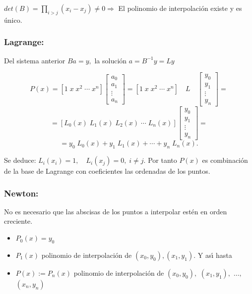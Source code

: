 \documentclass[twoside]{report}
\begin{document}
\vspace{0.3cm}

$det(B)=\prod_ {i>j}(x_i-x_j)\neq 0 \Rightarrow$ El polinomio de interpolaci\'{o}n existe y es \'{u}nico.

\subsubsection{Lagrange:}

Del sistema anterior $Ba=y,$ la soluci\'{o}n $a=B^{-1}y=Ly$

$$P(x)=[1\;x\;x^2\; \cdots\; x^n]\left[\begin{array}{c} a_0\\a_1\\
\vdots \\a_n \end{array}\right]=[1\;x\;x^2\; \cdots\; x^n]\quad L\quad \left[\begin{array}{c} y_0\\y_1\\
\vdots \\y_n \end{array}\right]=$$
$$=[L_0(x)\;L_1(x)\;L_2(x)\; \cdots\; L_n(x)]\left[\begin{array}{c} y_0\\y_1\\
\vdots \\y_n
\end{array}\right]=$$
$$=y_0\;L_0(x)+y_1\;L_1(x)+\cdots+y_n\;L_n(x).$$

Se deduce: $L_i(x_i)=1,\quad L_i(x_j)=0, \;i\neq j.$ Por tanto $P(x)$ es combinaci\'{o}n de la base de Lagrange con coeficientes las ordenadas de los puntos.

\subsubsection{Newton:}

No es necesario que las abscisas de los puntos a interpolar est\'{e}n en orden creciente.

\begin{itemize}
\item $P_0(x)=y_0$
\item $P_1(x)$ polinomio de interpolaci\'{o}n de $(x_0,y_0), (x_1,y_1).$ Y as\'{\i} hasta
\item $P(x):=P_n(x)$ polinomio de interpolaci\'{o}n de $(x_0,y_0),$ $(x_1,y_1),$ $\ldots,$ $(x_n,y_n)$
\end{itemize}
\end{document}
